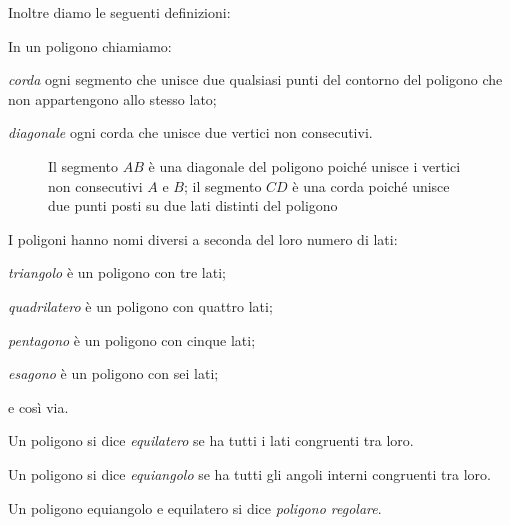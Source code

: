 Inoltre diamo le seguenti definizioni:
\begin{definizione}
In un poligono chiamiamo:
\begin{itemize*}
\item \emph{corda} ogni segmento che unisce due qualsiasi punti del 
contorno del poligono che non appartengono allo stesso lato;
\item \emph{diagonale} ogni corda che unisce due vertici non 
consecutivi.
\end{itemize*}
\end{definizione}


\begin{inaccessibleblock}
 \begin{figure}[htb]
\centering
\caption{Il segmento $AB$ è una diagonale del poligono poiché unisce 
i vertici non consecutivi $A$ e $B$; il segmento $CD$ è una corda 
poiché unisce due punti posti su due lati distinti del poligono}
\end{figure}
\end{inaccessibleblock}

I poligoni hanno nomi diversi a seconda del loro numero di lati:
\begin{itemize*}
\item \emph{triangolo} è un poligono con tre lati;
\item \emph{quadrilatero} è un poligono con quattro lati;
\item \emph{pentagono} è un poligono con cinque lati;
\item \emph{esagono} è un poligono con sei lati;
\item e così via.
\end{itemize*}

\begin{definizione}
Un poligono si dice \emph{equilatero} se ha tutti i lati congruenti 
tra loro.
\end{definizione}

\begin{definizione}
Un poligono si dice \emph{equiangolo} se ha tutti gli angoli interni 
congruenti tra loro.
\end{definizione}

\begin{definizione}
Un poligono equiangolo e equilatero si dice \emph{poligono regolare}.
\end{definizione}

\ovalbox{\risolvii \ref{ese:1.125}, \ref{ese:1.126}, \ref{ese:1.127}, 
\ref{ese:1.128}, \ref{ese:1.129}, \ref{ese:1.130}, \ref{ese:1.131}, 
\ref{ese:1.132}, \ref{ese:1.133}, \ref{ese:1.134}}



